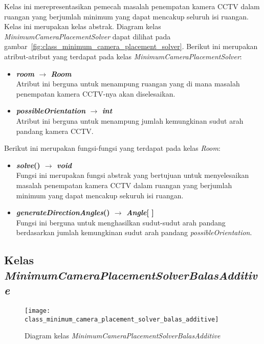 Kelas ini merepresentasikan pemecah masalah penempatan kamera CCTV dalam ruangan yang berjumlah minimum yang dapat mencakup seluruh isi ruangan. Kelas ini merupakan kelas abstrak. Diagram kelas \textit{MinimumCameraPlacementSolver} dapat dilihat pada gambar~\ref{fig:class_minimum_camera_placement_solver}. Berikut ini merupakan atribut-atribut yang terdapat pada kelas \textit{MinimumCameraPlacementSolver}:
\begin{itemize}
	\item \textbf{\textit{room} \(\rightarrow\) \textit{Room}}\\
	Atribut ini berguna untuk menampung ruangan yang di mana masalah penempatan kamera CCTV-nya akan diselesaikan.
	\item \textbf{\textit{possibleOrientation} \(\rightarrow\) \textit{int}}\\
	Atribut ini berguna untuk menampung jumlah kemungkinan sudut arah pandang kamera CCTV.
\end{itemize}
Berikut ini merupakan fungsi-fungsi yang terdapat pada kelas \textit{Room}:
\begin{itemize}
	\item \textbf{\textit{solve}() \(\rightarrow\) \textit{void}}\\
	Fungsi ini merupakan fungsi abstrak yang bertujuan untuk menyelesaikan masalah penempatan kamera CCTV dalam ruangan yang berjumlah minimum yang dapat mencakup sekuruh isi ruangan.
	\item \textbf{\textit{generateDirectionAngles}() \(\rightarrow\) \textit{Angle}[ ]}\\
	Fungsi ini berguna untuk menghasilkan sudut-sudut arah pandang berdasarkan jumlah kemungkinan sudut arah pandang \textit{possibleOrientation}.
\end{itemize}

\subsection{Kelas \textit{MinimumCameraPlacementSolverBalasAdditive}}
\begin{figure}[H]
	\centering  
	\texttt{[image: class\_minimum\_camera\_placement\_solver\_balas\_additive]}
	\caption[Diagram kelas \textit{MinimumCameraPlacementSolverBalasAdditive}]{Diagram kelas \textit{MinimumCameraPlacementSolverBalasAdditive}}
	\label{fig:class_minimum_camera_placement_solver_balas_additive}
\end{figure}

